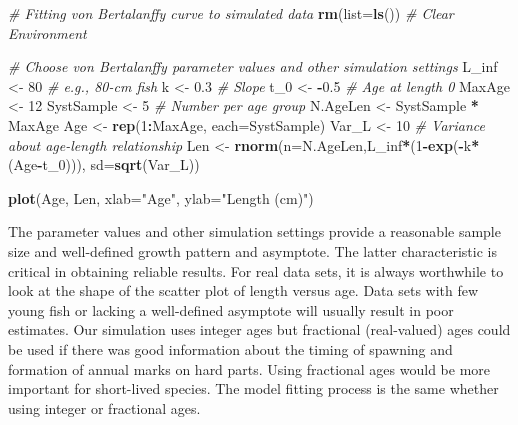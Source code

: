 \documentclass[
]{krantz}
\makeatletter
\newenvironment{Shaded}{\begin{snugshade}}{\end{snugshade}}
\newcommand{\AttributeTok}[1]{\textcolor[rgb]{0.27,0.27,0.27}{#1}}
\newcommand{\CommentTok}[1]{\textcolor[rgb]{0.37,0.37,0.37}{\textit{#1}}}
\newcommand{\DecValTok}[1]{\textcolor[rgb]{0.06,0.06,0.06}{#1}}
\newcommand{\FloatTok}[1]{\textcolor[rgb]{0.06,0.06,0.06}{#1}}
\newcommand{\FunctionTok}[1]{\textcolor[rgb]{0.27,0.27,0.27}{\textbf{#1}}}
\newcommand{\NormalTok}[1]{#1}
\newcommand{\OtherTok}[1]{\textcolor[rgb]{0.37,0.37,0.37}{#1}}
\newcommand{\SpecialCharTok}[1]{\textcolor[rgb]{0.43,0.43,0.43}{\textbf{#1}}}
\newcommand{\StringTok}[1]{\textcolor[rgb]{0.5,0.5,0.5}{#1}}
\newenvironment{kframe}{%
\medskip{}
\setlength{\fboxsep}{.8em}
 \def\at@end@of@kframe{}%
 \ifinner\ifhmode%
  \def\at@end@of@kframe{\end{minipage}}%
  \begin{minipage}{\columnwidth}%
 \fi\fi%
 \def\FrameCommand##1{\hskip\@totalleftmargin \hskip-\fboxsep
 \colorbox{shadecolor}{##1}\hskip-\fboxsep
     \hskip-\linewidth \hskip-\@totalleftmargin \hskip\columnwidth}%
 \MakeFramed {\advance\hsize-\width
   \@totalleftmargin\z@ \linewidth\hsize
   \@setminipage}}%
 {\par\unskip\endMakeFramed%
 \at@end@of@kframe}
\renewenvironment{Shaded}{\begin{kframe}}{\end{kframe}}
\makeatother
\begin{document}
\begin{Shaded}
\begin{Highlighting}[]
\CommentTok{\# Fitting von Bertalanffy curve to simulated data}
\FunctionTok{rm}\NormalTok{(}\AttributeTok{list=}\FunctionTok{ls}\NormalTok{()) }\CommentTok{\# Clear Environment}

\CommentTok{\# Choose von Bertalanffy parameter values and other simulation settings}
\NormalTok{L\_inf }\OtherTok{\textless{}{-}} \DecValTok{80}  \CommentTok{\# e.g., 80{-}cm fish}
\NormalTok{k }\OtherTok{\textless{}{-}} \FloatTok{0.3} \CommentTok{\# Slope}
\NormalTok{t\_0 }\OtherTok{\textless{}{-}} \SpecialCharTok{{-}}\FloatTok{0.5} \CommentTok{\# Age at length 0}
\NormalTok{MaxAge }\OtherTok{\textless{}{-}} \DecValTok{12}
\NormalTok{SystSample }\OtherTok{\textless{}{-}} \DecValTok{5}  \CommentTok{\# Number per age group}
\NormalTok{N.AgeLen }\OtherTok{\textless{}{-}}\NormalTok{ SystSample }\SpecialCharTok{*}\NormalTok{ MaxAge}
\NormalTok{Age }\OtherTok{\textless{}{-}} \FunctionTok{rep}\NormalTok{(}\DecValTok{1}\SpecialCharTok{:}\NormalTok{MaxAge, }\AttributeTok{each=}\NormalTok{SystSample)}
\NormalTok{Var\_L }\OtherTok{\textless{}{-}} \DecValTok{10} \CommentTok{\# Variance about age{-}length relationship}
\NormalTok{Len }\OtherTok{\textless{}{-}} \FunctionTok{rnorm}\NormalTok{(}\AttributeTok{n=}\NormalTok{N.AgeLen,L\_inf}\SpecialCharTok{*}\NormalTok{(}\DecValTok{1}\SpecialCharTok{{-}}\FunctionTok{exp}\NormalTok{(}\SpecialCharTok{{-}}\NormalTok{k}\SpecialCharTok{*}\NormalTok{(Age}\SpecialCharTok{{-}}\NormalTok{t\_0))), }\AttributeTok{sd=}\FunctionTok{sqrt}\NormalTok{(Var\_L))}

\FunctionTok{plot}\NormalTok{(Age, Len, }\AttributeTok{xlab=}\StringTok{"Age"}\NormalTok{, }\AttributeTok{ylab=}\StringTok{"Length (cm)"}\NormalTok{)}
\end{Highlighting}
\end{Shaded}

The parameter values and other simulation settings provide a reasonable sample size and well-defined growth pattern and asymptote. The latter characteristic is critical in obtaining reliable results. For real data sets, it is always worthwhile to look at the shape of the scatter plot of length versus age. Data sets with few young fish or lacking a well-defined asymptote will usually result in poor estimates. Our simulation uses integer ages but fractional (real-valued) ages could be used if there was good information about the timing of spawning and formation of annual marks on hard parts. Using fractional ages would be more important for short-lived species. The model fitting process is the same whether using integer or fractional ages.
\end{document}
